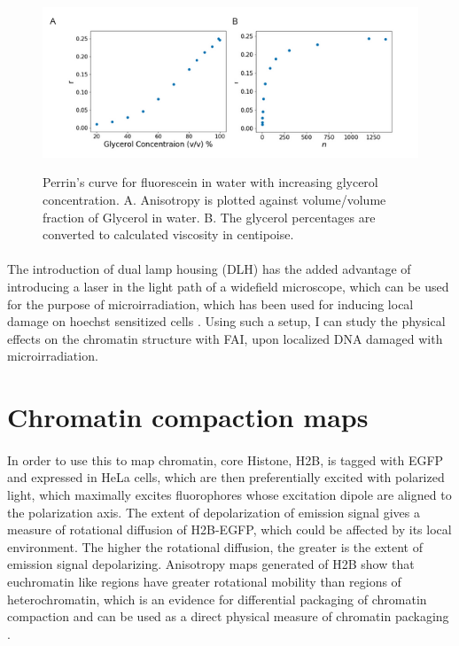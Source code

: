 \begin{figure}[!htp]
    {\hfill\includegraphics[clip,width=1\linewidth]{figures/perrin.png}\hspace*{\fill}}
    \caption{Perrin's curve for fluorescein in water with increasing glycerol concentration. A. Anisotropy is plotted against volume/volume fraction of Glycerol in water. B. The glycerol percentages are converted to calculated viscosity in centipoise.}
    {\label{fig:perrin}}
\end{figure}

\paragraph*{} The introduction of dual lamp housing (DLH) has the added advantage of introducing a laser in the light path of a widefield microscope, which can be used for the purpose of microirradiation, which has been used for inducing local damage on hoechst sensitized cells \cite{BURGESS20141703}. Using such a setup, I can study the physical effects on the chromatin structure with FAI, upon localized DNA damaged with microirradiation.

\section{Chromatin compaction maps}
\paragraph*{} In order to use this to map chromatin, core Histone, H2B, is tagged with EGFP and expressed in HeLa cells, which are then preferentially excited with polarized light, which maximally excites fluorophores whose excitation dipole are aligned to the polarization axis. The extent of depolarization of emission signal gives a measure of rotational diffusion of H2B-EGFP, which could be affected by its local environment. The higher the rotational diffusion, the greater is the extent of emission signal depolarizing. Anisotropy maps generated of H2B show that euchromatin like regions have greater rotational mobility than regions of heterochromatin, which is an evidence for differential packaging of chromatin compaction and can be used as a direct physical measure of chromatin packaging \cite{bhattacharya2009spatio}.

